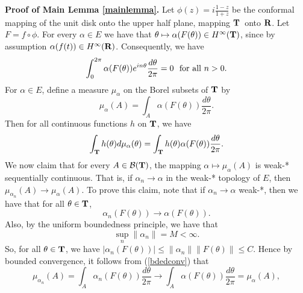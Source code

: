 \bigskip
\noindent
{\bf Proof of Main Lemma \ref{mainlemma}.}  Let $\phi (z)=i \frac{1 - z}{1+z}$
be the conformal mapping of the unit disk onto 
the upper half plane, mapping $\T$\ onto $\R$.  
Let $F=f\circ \phi$.  For every $\alpha\in E$ we have that
$\theta\mapsto\alpha (F(\theta))\in H^\infty (\T)$, since by assumption
$\alpha (f(t))\in H^\infty (\R)$.
Consequently, we have
\begin{equation}
\int_0^{2 \pi} \alpha (F(\theta))e^{i n \theta} 
\frac{d \theta}{2 \pi}= 0 \ \
{\rm for\ all}\ n > 0.
\label{negativefc}
\end{equation}
For $\alpha\in E$, define a measure $\mu_\alpha$ on 
the Borel subsets of $\T$ by
\begin{equation}
\mu_\alpha(A)=\int_A \alpha(F(\theta))\frac{d\theta}{2 \pi}.
\label{musbe}
\end{equation}
Then for all continuous functions $h$ on $\T$, we have
\begin{equation}
\int_\T h(\theta) d\mu_\alpha(\theta)=\int_\T h(\theta)
\alpha(F(\theta))\frac{d\theta}{2\pi}.
\label{intmusbe}
\end{equation}
We 
now claim that for every $A\in {\cal B}(\T)$, 
the mapping $\alpha\mapsto\mu_\alpha(A)$ is weak-* 
sequentially continuous.  That is, if $\alpha_n\rightarrow \alpha$ 
in the weak-* topology of $E$, then
$\mu_{\alpha_n}(A)\rightarrow\mu_\alpha(A)$.  To prove 
this claim, note that if $\alpha_n\rightarrow \alpha$ weak-*, 
then we have that for all $\theta\in \T$, 
\begin{equation}
\alpha_n(F(\theta))\rightarrow \alpha(F(\theta)).
\label{bdedconv}
\end{equation}
Also, by the uniform boundedness principle, we have that
$$\sup_n \|\alpha_n\|=M<\infty .$$ 
So, for all $\theta\in\T$, we have 
$|\alpha_n(F(\theta))|\leq \|\alpha_n\| \|F(\theta)\|
\leq C$.  Hence by bounded convergence, it 
follows from (\ref{bdedconv}) that
\begin{equation}
\mu_{\alpha_n}(A)=
\int_A \alpha_n(F(\theta))\frac{d\theta}{2 \pi}\rightarrow
\int_A \alpha(F(\theta))\frac{d\theta}{2 \pi}
=\mu_\alpha(A),
\label{weak-*conv}
\end{equation}
